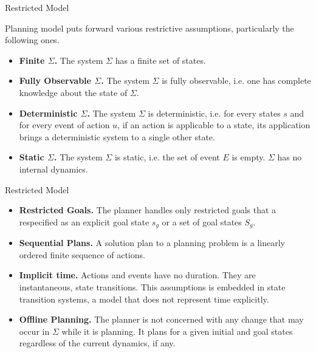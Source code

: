 \documentclass[9pt]{beamer}
\begin{document}
\begin{frame}{Restricted Model}
\begin{small}

Planning model puts forward various restrictive assumptions, particularly the following ones.
\begin{itemize}
\item \textbf{Finite $\Sigma$.} The system $\Sigma$ has a finite set of states.
\item \textbf{Fully Observable $\Sigma$.} The system $\Sigma$ is fully observable, i.e. one has complete knowledge about the state of $\Sigma$.
\item \textbf{Deterministic $\Sigma$.} The system $\Sigma$ is deterministic, i.e. for every states $s$ and for every event of action $u$, if an action is applicable to a state, its application brings a deterministic system to a single other state.
\item \textbf{Static $\Sigma$.} The system $\Sigma$ is static, i.e. the set of event $E$ is empty. $\Sigma$ has no internal dynamics.
\end{itemize}

\end{small}
\end{frame}

\begin{frame}{Restricted Model}
\begin{small}

\begin{itemize}
\item \textbf{Restricted Goals.} The planner handles only restricted goals that a respecified as an explicit goal state $s_g$ or a set of goal states $S_g$.
\item \textbf{Sequential Plans.} A solution plan to a planning problem is a linearly ordered finite sequence of actions.
\item \textbf{Implicit time.} Actions and events have no duration. They are instantaneous, state transitions. This assumptions is embedded in state transition systems, a model that does not represent time explicitly.
\item \textbf{Offline Planning.} The planner is not concerned with any change that may occur in $\Sigma$ while it is planning. It plans for a given initial and goal states regardless of the current dynamics, if any.
\end{itemize}
\end{small}
\end{frame}
\end{document}
